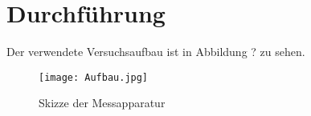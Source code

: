 \section{Durchführung}
\label{sec:Durchführung}

Der verwendete Versuchsaufbau ist in Abbildung ? zu sehen.\\
\begin{figure}[h]
    \centering
    \texttt{[image: Aufbau.jpg]}
    \caption{Skizze der Messapparatur}
    \label{fig:Skizze der Messapparatur}
\end{figure}\\
